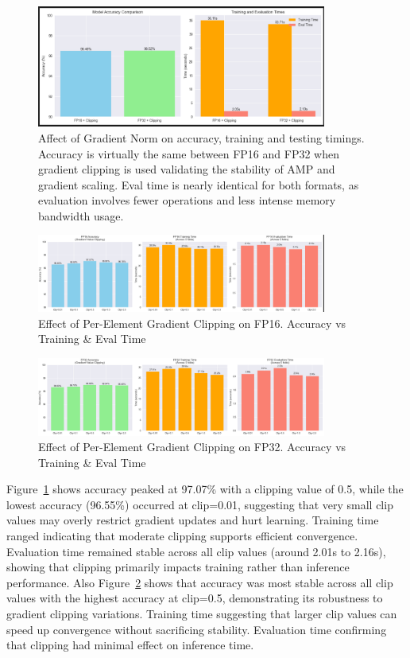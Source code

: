 \documentclass[11pt]{article}
\begin{document}
\begin{figure}[H]
	\centering
	\includegraphics[width=0.85\textwidth]{figures/FP16_32_clipping.png}
	\caption{Affect of Gradient Norm on accuracy, training and testing timings.
		Accuracy is virtually the same between FP16 and FP32 when gradient clipping is used
		validating the stability of AMP and gradient scaling.
		Eval time is nearly identical for both formats, as evaluation involves fewer operations
		and less intense memory bandwidth usage.}
\end{figure}

\begin{figure}[H]
	\centering
	\includegraphics[width=0.85\textwidth]{figures/gradclip_16.png}
	\caption{Effect of Per-Element Gradient Clipping on FP16.
		Accuracy vs Training & Eval Time}
	\label{fig:grad16}
\end{figure}

\begin{figure}[H]
	\centering
	\includegraphics[width=0.85\textwidth]{figures/gradclip_32.png}
	\caption{Effect of Per-Element Gradient Clipping on FP32.
		Accuracy vs Training & Eval Time}
	\label{fig:grad32}
\end{figure}

Figure~\ref{fig:grad16} shows accuracy peaked at 97.07\% with a clipping value
of 0.5, while the lowest accuracy (96.55\%) occurred at clip=0.01, suggesting
that very small clip values may overly restrict gradient updates and hurt
learning. Training time ranged indicating that moderate clipping supports
efficient convergence. Evaluation time remained stable across all clip values
(around 2.01s to 2.16s), showing that clipping primarily impacts training
rather than inference performance. Also Figure~\ref{fig:grad32} shows that
accuracy was most stable across all clip values with the highest accuracy at
clip=0.5, demonstrating its robustness to gradient clipping variations.
Training time suggesting that larger clip values can speed up convergence
without sacrificing stability. Evaluation time confirming that clipping had
minimal effect on inference time.
\end{document}
